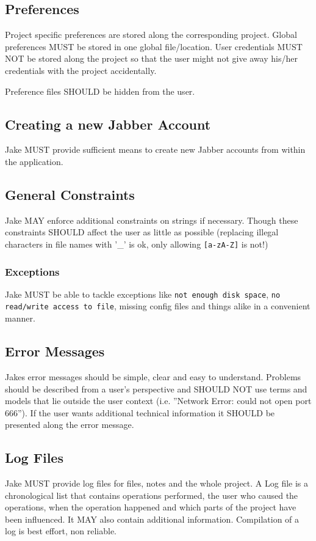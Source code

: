 \subsection{Preferences}
Project specific preferences are stored along the corresponding project. Global preferences MUST be stored in one global file/location. User credentials MUST NOT be stored along the project so that the user might not give away his/her credentials with the project accidentally.

Preference files SHOULD be hidden from the user.

\subsection{Creating a new Jabber Account}
Jake MUST provide sufficient means to create new Jabber accounts from within the application.

\subsection{General Constraints}
Jake MAY enforce additional constraints on strings if necessary. Though these constraints SHOULD affect the user as little as possible (replacing illegal characters in file names with '\_' is ok, only allowing \texttt{[a-zA-Z]} is not!)

\subsubsection{Exceptions}
Jake  MUST be able to tackle exceptions like \texttt{not enough disk space}, \texttt{no read/write access to file}, missing config files and things alike in a convenient manner. 

\subsection{Error Messages}
Jakes error messages should be simple, clear and easy to understand. Problems should be described from a user's perspective and SHOULD NOT use terms and models that lie outside the user context (i.e. ''Network Error: could not open port 666''). If the user wants additional technical information it SHOULD be presented along the error message. 

\subsection{Log Files}
Jake MUST provide log files for files, notes and the whole project. A Log file is a chronological list that contains operations performed, the user who caused the operations, when the operation happened and which parts of the project have been influenced. It MAY also contain additional information. Compilation of a log is best effort, non reliable.

